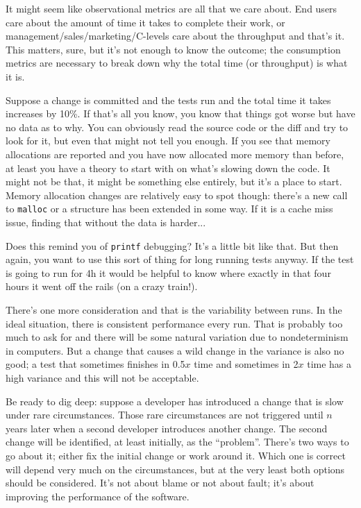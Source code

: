 \documentclass[a4paper]{report}
\begin{document}
It might seem like observational metrics are all that we care about. End users care about the amount of time it takes to complete their work, or management/sales/marketing/C-levels care about the throughput and that's it. This matters, sure, but it's not enough to know the outcome; the consumption metrics are necessary to break down why the total time (or throughput) is what it is.

Suppose a change is committed and the tests run and the total time it takes increases by 10\%. If that's all you know, you know that things got worse but have no data as to why. You can obviously read the source code or the diff and try to look for it, but even that might not tell you enough. If you see that memory allocations are reported and you have now allocated more memory than before,  at least you have a theory to start with on what's slowing down the code. It might not be that, it might be something else entirely, but it's a place to start. Memory allocation changes are relatively easy to spot though: there's a new call to \texttt{malloc} or a structure has been extended in some way. If it is a cache miss issue, finding that without the data is harder...

Does this remind you of \texttt{printf} debugging? It's a little bit like that. But then again, you want to use this sort of thing for long running tests anyway. If the test is going to run for 4h it would be helpful to know where exactly in that four hours it went off the rails (on a crazy train!). 

There's one more consideration and that is the variability between runs. In the ideal situation, there is consistent performance every run. That is probably too much to ask for and there will be some natural variation due to nondeterminism in computers. But a change that causes a wild change in the variance is also no good; a test that sometimes finishes in 0.5$x$ time and sometimes in 2$x$ time has a high variance and this will not be acceptable. 

Be ready to dig deep: suppose a developer has introduced a change that is slow under rare circumstances. Those rare circumstances are not triggered until $n$ years later when a second developer introduces another change. The second change will be identified, at least initially, as the ``problem''. There's two ways to go about it; either fix the initial change or work around it. Which one is correct will depend very much on the circumstances, but at the very least both options should be considered. It's not about blame or not about fault; it's about improving the performance of the software.
\end{document}
